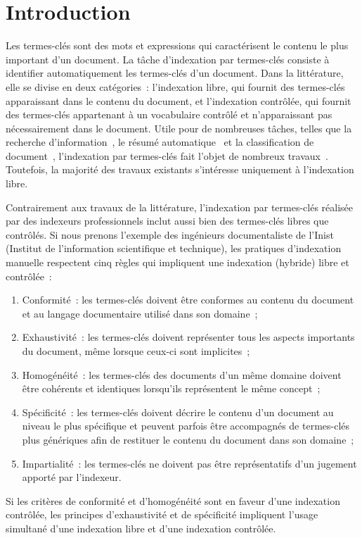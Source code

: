 \section{Introduction}
\label{sec:main:domain_specific_keyphrase_annotation-introduction}
  Les termes-clés sont des mots et expressions qui caractérisent le contenu le
  plus important d'un document. La tâche d'indexation par termes-clés consiste à
  identifier automatiquement les termes-clés d'un document. Dans la littérature,
  elle se divise en deux catégories~: l'indexation libre, qui fournit des
  termes-clés apparaissant dans le contenu du document, et l'indexation
  contrôlée, qui fournit des termes-clés appartenant à un vocabulaire contrôlé
  et n'apparaissant pas nécessairement dans le document. Utile pour de
  nombreuses tâches, telles que la recherche
  d'information~\cite{jones1999phrasier}, le résumé
  automatique~\cite{avanzo2005keyphrase} et la classification de
  document~\cite{han2007webdocumentclustering}, l'indexation par termes-clés
  fait l'objet de nombreux travaux~\cite{hasan2014state_of_the_art}. Toutefois,
  la majorité des travaux existants s'intéresse uniquement à l'indexation libre.
  
  Contrairement aux travaux de la littérature, l'indexation par termes-clés
  réalisée par des indexeurs professionnels inclut aussi bien des termes-clés
  libres que contrôlés. Si nous prenons l'exemple des ingénieurs documentaliste
  de l'Inist (Institut de l'information scientifique et technique), les
  pratiques d'indexation manuelle respectent cinq règles qui impliquent une
  indexation (hybride) libre et contrôlée~:
  \begin{enumerate}
    \item{Conformité~: les termes-clés doivent être conformes au contenu du
          document et au langage documentaire utilisé dans son domaine~;}
    \item{Exhaustivité~: les termes-clés doivent représenter tous les
          aspects importants du document, même lorsque ceux-ci sont
          implicites~;}
    \item{Homogénéité~: les termes-clés des documents d'un même domaine
          doivent être cohérents et identiques lorsqu'ils représentent le
          même concept~;}
    \item{Spécificité~: les termes-clés doivent décrire le contenu d'un
          document au niveau le plus spécifique et peuvent parfois être
          accompagnés de termes-clés plus génériques afin de restituer le
          contenu du document dans son domaine~;}
    \item{Impartialité~: les termes-clés ne doivent pas être représentatifs
          d'un jugement apporté par l'indexeur.}
  \end{enumerate}
  Si les critères de conformité et d'homogénéité sont en faveur d'une indexation
  contrôlée, les principes d'exhaustivité et de spécificité impliquent l'usage
  simultané d'une indexation libre et d'une indexation contrôlée.

